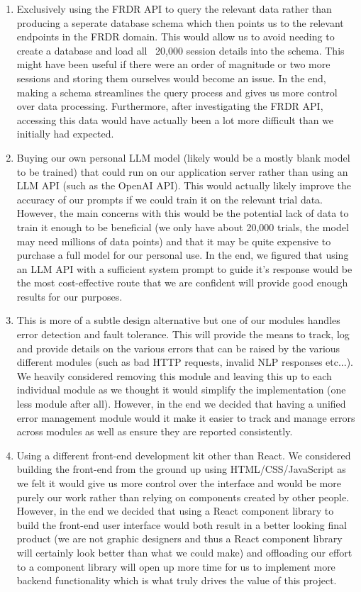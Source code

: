 \documentclass[12pt, titlepage]{article}
\begin{document}
\begin{enumerate}
  \begin{enumerate}
    \item{Exclusively using the FRDR API to query the relevant data rather than producing a seperate database schema which then points us to the relevant
    endpoints in the FRDR domain. This would allow us to avoid needing to create a database and load all ~20,000 session details into the schema. This
    might have been useful if there were an order of magnitude or two more sessions and storing them ourselves would become an issue. In the end, making
    a schema streamlines the query process and gives us more control over data processing. Furthermore, after investigating the FRDR API, accessing this
    data would have actually been a lot more difficult than we initially had expected.}
    \item{Buying our own personal LLM model (likely would be
    a mostly blank model to be trained) that could run on our application server rather than using an LLM API (such as the OpenAI API). This
    would actually likely improve the accuracy of our prompts if we could train it on the relevant trial data. However, the main concerns with this
    would be the potential lack of data to train it enough to be beneficial (we only have about 20,000 trials, the model may need millions of
    data points) and that it may be quite expensive to purchase a full model for our personal use. In the end, we figured that using an LLM API
    with a sufficient system prompt to guide it's response would be the most cost-effective route that we are confident will provide good enough
    results for our purposes.}
    \item{This is more of a subtle design alternative but one of our modules handles error detection and fault tolerance. This will provide the means
    to track, log and provide details on the various errors that can be raised by the various different modules (such as bad HTTP requests, invalid
    NLP responses etc...). We heavily considered removing this module and leaving this up to each individual module as we thought it would simplify
    the implementation (one less module after all). However, in the end we decided that having a unified error management module would it make it
    easier to track and manage errors across modules as well as ensure they are reported consistently.}
    \item{Using a different front-end development kit other than React. We considered building the front-end from the ground up using HTML/CSS/JavaScript
    as we felt it would give us more control over the interface and would be more purely our work rather than relying on components created by other people.
    However, in the end we decided that using a React component library to build the front-end user interface would both result in a better looking final
    product (we are not graphic designers and thus a React component library will certainly look better than what we could make) and offloading our effort
    to a component library will open up more time for us to implement more backend functionality which is what truly drives the value of this project.}
  \end{enumerate}



\end{enumerate}
\end{document}
